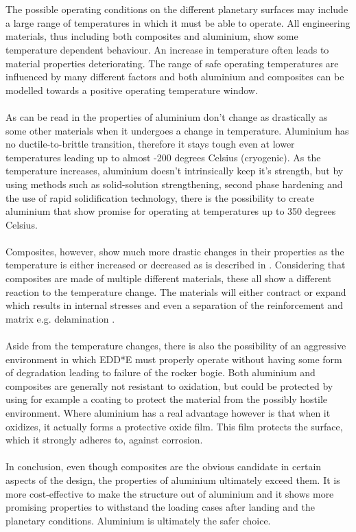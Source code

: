 \\
\\
The possible operating conditions on the different planetary surfaces may include a large range of temperatures in which it must be able to operate. All engineering materials, thus including both composites and aluminium, show some temperature dependent behaviour. An increase in temperature often leads to material properties deteriorating. The range of safe operating temperatures are influenced by many different factors and both aluminium and composites can be modelled towards a positive operating temperature window.
\\
\\
As can be read in \cite{thermal-properties-aluminium} the properties of aluminium don’t change as drastically as some other materials when it undergoes a change in temperature. Aluminium has no ductile-to-brittle transition, therefore it stays tough even at lower temperatures leading up to almost  -200 degrees Celsius (cryogenic). As the temperature increases, aluminium doesn’t intrinsically keep it’s strength, but by using methods such as solid-solution strengthening, second phase hardening and the use of rapid solidification technology, there is the possibility to create aluminium that show promise for operating at temperatures up to 350 degrees Celsius.
\\
\\
Composites, however, show much more drastic changes in their properties as the temperature is either increased or decreased as is described in \cite{Thermal-behaviour-of-composites}. Considering that composites are made of multiple different materials, these all show a different reaction to the temperature change. The materials will either contract or expand which results in internal stresses and even a separation of the reinforcement and matrix e.g. delamination \cite{Thermomechanical-behaviour-of-composite-materials}.
\\
\\
Aside from the temperature changes, there is also the possibility of an aggressive environment in which EDD*E must properly operate without having some form of degradation leading to failure of the rocker bogie. Both aluminium and composites are generally not resistant to oxidation, but could be protected by using for example a coating to protect the material from the possibly hostile environment. Where aluminium has a real advantage however is that when it oxidizes, it actually forms a protective oxide film. This film protects the surface, which it strongly adheres to, against corrosion.
\\
\\
In conclusion, even though composites are the obvious candidate in certain aspects of the design, the properties of aluminium ultimately exceed them. It is more cost-effective to make the structure out of aluminium and it shows more promising properties to withstand the loading cases after landing and the planetary conditions. Aluminium is ultimately the safer choice.



